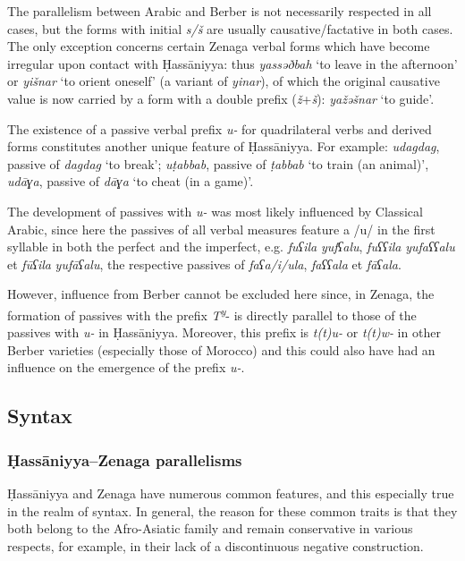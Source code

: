 \documentclass[output=paper]{langsci/langscibook}
\begin{document}
The parallelism between Arabic and Berber is not necessarily respected in all cases, but the forms with initial \textit{s/š} are usually causative/factative in both cases. The only exception concerns certain Zenaga verbal forms which have become irregular upon contact with Ḥassāniyya: thus \textit{yassəðbah} ‘to leave in the afternoon’ or \textit{yišnar} ‘to orient oneself’ (a variant of \textit{yinar}), of which the original causative value is now carried by a form with a double prefix (\textit{ž}+\textit{š}): \textit{yažəšnar} ‘to guide’.


The existence of a passive verbal prefix \textit{u-} for quadrilateral verbs and derived forms constitutes another unique feature of Ḥassāniyya. For example: \textit{udagdag}, passive of \textit{dagdag} ‘to break’; \textit{uṭabbab}, passive of \textit{ṭabbab} ‘to train (an animal)’, \textit{udāɣa}, passive of \textit{dāɣa} ‘to cheat (in a game)’.

The development of passives with \textit{u-} was most likely influenced by Classical Arabic, since here the passives of all verbal measures feature a /u/ in the first syllable in both the perfect and the imperfect, e.g. \textit{fuʕila} \textit{yu}\textit{fʕalu}, \textit{fuʕʕila} \textit{yu}\textit{faʕʕalu} et \textit{fūʕila} \textit{yu}\textit{fāʕalu}, the respective passives of \textit{faʕa/i/ula}, \textit{faʕʕala} et \textit{fāʕala}.

However, influence from Berber cannot be excluded here since, in Zenaga, the formation of passives with the prefix \textit{T\textsuperscript{y}}{}-\textit{\textsuperscript{} }is directly parallel to those of the passives with \textit{u-} in Ḥassāniyya. Moreover, this prefix is \textit{t(t)u-} or \textit{t(t)w-} in other Berber varieties (especially those of Morocco) and this could also have had an influence on the emergence of the prefix \textit{u-}. 

\subsection{ Syntax} %

\subsubsection{ Ḥassāniyya–Zenaga parallelisms} %

Ḥassāniyya and Zenaga have numerous common features, and this especially true in the realm of syntax. In general, the reason for these common traits is that they both belong to the Afro-Asiatic family and remain conservative in various respects, for example, in their lack of a discontinuous negative construction.
\end{document}
